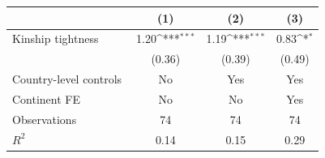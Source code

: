 {
\def\sym#1{\ifmmode^{#1}\else\(^{#1}\)\fi}
\begin{tabular}{l*{3}{c}}
\toprule
                &\multicolumn{1}{c}{(1)}         &\multicolumn{1}{c}{(2)}         &\multicolumn{1}{c}{(3)}         \\
\midrule
Kinship tightness $\qquad$&     1.20\sym{***}&     1.19\sym{***}&     0.83\sym{*}  \\
                &   (0.36)         &   (0.39)         &   (0.49)         \\
\addlinespace
Country-level controls&       No         &      Yes         &      Yes         \\
\addlinespace
Continent FE    &       No         &       No         &      Yes         \\
\midrule
Observations    &       74         &       74         &       74         \\
\(R^{2}\)       &     0.14         &     0.15         &     0.29         \\
\bottomrule
\end{tabular}
}
